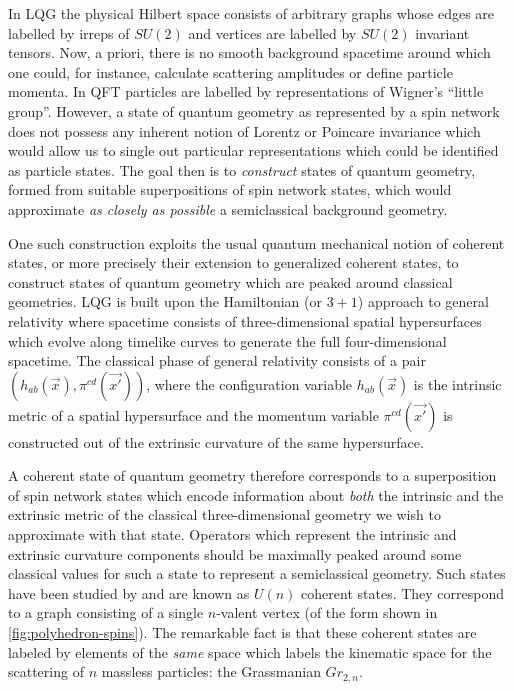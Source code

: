 \documentclass[twocolumn,final,aps,nofootinbib,nobibnotes]{revtex4-2}
\begin{document}
In LQG the physical Hilbert space consists of arbitrary graphs whose edges are labelled by irreps of $ SU(2) $ and vertices are labelled by $ SU(2) $ invariant tensors. Now, a priori, there is no smooth background spacetime around which one could, for instance, calculate scattering amplitudes or define particle momenta. In QFT particles are labelled by representations of Wigner's ``little group''. However, a state of quantum geometry as represented by a spin network does not possess any inherent notion of Lorentz or Poincare invariance which would allow us to single out particular representations which could be identified as particle states. The goal then is to \emph{construct} states of quantum geometry, formed from suitable superpositions of spin network states, which would approximate \emph{as closely as possible} a semiclassical background geometry.

One such construction exploits the usual quantum mechanical notion of coherent states, or more precisely their extension to generalized coherent states, to construct states of quantum geometry which are peaked around classical geometries. LQG is built upon the Hamiltonian (or $ 3+1 $) approach to general relativity where spacetime consists of three-dimensional spatial hypersurfaces which evolve along timelike curves to generate the full four-dimensional spacetime. The classical phase of general relativity consists of a pair $ (h_{ab}(\vec x), \pi^{cd}(\vec{x'})) $, where the configuration variable $ h_{ab}(\vec x) $ is the intrinsic metric of a spatial hypersurface and the momentum variable $ \pi^{cd}(\vec{x'}) $ is constructed out of the extrinsic curvature of the same hypersurface.

A coherent state of quantum geometry therefore corresponds to a superposition of spin network states which encode information about \emph{both} the intrinsic and the extrinsic metric of the classical three-dimensional geometry we wish to approximate with that state. Operators which represent the intrinsic and extrinsic curvature components should be maximally peaked around some classical values for such a state to represent a semiclassical geometry. Such states have been studied by \cite{Freidel2009The-Fine,Freidel2010UN-Coherent} and are known as $ U(n) $ coherent states. They correspond to a graph consisting of a single $ n $-valent vertex (of the form shown in \autoref{fig:polyhedron-spins}). The remarkable fact is that these coherent states are labeled by elements of the \emph{same} space which labels the kinematic space for the scattering of $ n $ massless particles: the Grassmanian $ Gr_{2,n} $.
\end{document}
